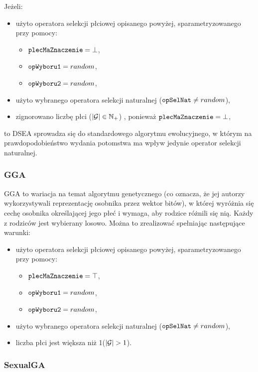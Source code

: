 \documentclass[./FM_mgr.tex]{subfiles}
\begin{document}
Jeżeli:
\begin{itemize}
	\item użyto operatora selekcji płciowej opisanego powyżej, sparametryzowanego przy pomocy:
	\begin{itemize}
		\item $\mathtt{plecMaZnaczenie} = \bot$,
		\item $\mathtt{opWyboru1} = random$,
		\item $\mathtt{opWyboru2} = random$,
	\end{itemize}
	\item użyto wybranego operatora selekcji naturalnej ($\mathtt{opSelNat} \neq random$),
	\item zignorowano liczbę płci ($|\mathcal{G}| \in \mathbb{N}_{+}$) , ponieważ $\mathtt{plecMaZnaczenie} = \bot$,
\end{itemize}
to DSEA sprowadza się do standardowego algorytmu ewolucyjnego, w którym na prawdopodobieństwo wydania potomstwa ma wpływ jedynie operator selekcji naturalnej.

\subsubsection{GGA}

GGA \cite{GGA} to wariacja na temat algorytmu genetycznego (co oznacza, że jej autorzy wykorzystywali reprezentację osobnika przez wektor bitów), w której wyróżnia się cechę osobnika określającej jego płeć i wymaga, aby rodzice różnili się nią. Każdy z rodziców jest wybierany losowo. Można to zrealizować spełniając następujące warunki:
\begin{itemize}
	\item użyto operatora selekcji płciowej opisanego powyżej, sparametryzowanego przy pomocy:
	\begin{itemize}
		\item $\mathtt{plecMaZnaczenie} = \top$,
		\item $\mathtt{opWyboru1} = random$,
		\item $\mathtt{opWyboru2} = random$,
	\end{itemize}
	\item użyto wybranego operatora selekcji naturalnej ($\mathtt{opSelNat} \neq random$),
	\item liczba płci jest większa niż 1($|\mathcal{G}| > 1$).
\end{itemize}

\subsubsection{SexualGA}
\end{document}
